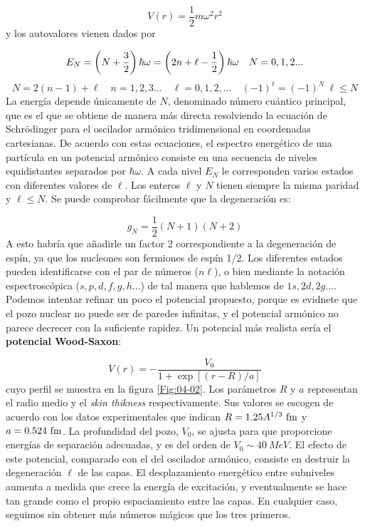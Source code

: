 \begin{equation}
	V(r) = \frac{1}{2} m \omega^2 r^2
\end{equation}
y los autovalores vienen dados por

\begin{equation}
	E_N = \left( N+ \frac{3}{2} \right)\hbar \omega = \left( 2n + \ell - \frac{1}{2} \right) \hbar \omega \quad N=0,1,2...
\end{equation}
\begin{equation}
	N=2(n-1)+\ell \quad n=1,2,3\ldots \quad \ell = 0,1,2,\ldots \quad (-1)^{\ell} = (-1)^N \ \ell \leq N
\end{equation}
La energía depende únicamente de $N$, denominado número cuántico principal, que es el que se obtiene de manera más directa resolviendo la ecuación de Schrödinger para el oscilador armónico tridimensional en coordenadas cartesianas. De acuerdo con estas ecuaciones, el espectro energético de una partícula en un potencial armónico consiste en una secuencia de niveles equidistantes separados por $\hbar \omega$. A cada nivel $E_N$ le corresponden varios estados con diferentes valores de $\ell$. Los enteros $\ell$ y $N$ tienen siempre la misma paridad y $\ell \leq N$. Se puede comprobar fácilmente que la degeneración es:

\begin{equation}
	g_N = \frac{1}{2}(N+1)(N+2)
\end{equation}
A esto habría que añadirle un factor 2 correspondiente a la degeneración de espín, ya que los nucleones son fermiones de espín 1/2. Los diferentes estados pueden identificarse con el par de números ($n \ell$), o bien mediante la notación espectroscópica ($s,p,d,f,g,h\ldots$) de tal manera que hablemos de $1s,2d,2g\ldots$. \\


Podemos intentar refinar un poco el potencial propuesto, porque es evidnete que el pozo nuclear no puede ser de paredes infinitas, y el potencial armónico no parece decrecer con la suficiente rapidez. Un potencial más realista sería el \textbf{potencial Wood-Saxon}:

\begin{equation}
	V(r) = - \frac{V_0}{1+\exp [(r-R)/a]}
\end{equation}
cuyo perfil se muestra en la figura \ref{Fig:04-02}. Los parámetros $R$ y $a$ representan el radio medio y el \textit{skin thikness} respectivamente. Sus valores se escogen de acuerdo con los datos experimentales que indican $R=\num{1.25} A^{1/3} \ \unit{\fm}$ y  $a=0.524 \ \unit{\fm}$. La profundidad del pozo, $V_0$, se ajusta para que proporcione  energías de separación adecuadas, y es del orden de $V_0\sim 40 \ \unit{MeV}$. El efecto de este potencial, comparado con el del oscilador armónico, consiste en destruir la degeneración $\ell$ de las capas. El desplazamiento energético entre subniveles aumenta a medida que crece la energía de excitación, y eventualmente se hace tan grande como el propio espaciamiento entre las capas. En cualquier caso, seguimos sin obtener más números mágicos que los tres primeros. 


